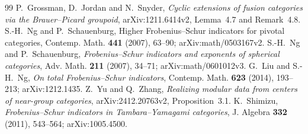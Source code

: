 \documentclass[11pt]{article}
\begin{document}
\begin{thebibliography}{99}
 P.~Grossman, D.~Jordan and N.~Snyder,
\emph{Cyclic extensions of fusion categories via the Brauer--Picard groupoid},
arXiv:1211.6414v2, Lemma~4.7 and Remark~4.8.
 S.-H.~Ng and P.~Schauenburg,
Higher Frobenius--Schur indicators for pivotal categories,
Contemp. Math. \textbf{441} (2007), 63--90; arXiv:math/0503167v2.
 S.-H.~Ng and P.~Schauenburg,
\emph{Frobenius--Schur indicators and exponents of spherical categories},
Adv. Math. \textbf{211} (2007), 34--71; arXiv:math/0601012v3.
 G.~Liu and S.-H.~Ng,
\emph{On total Frobenius--Schur indicators},
Contemp. Math. \textbf{623} (2014), 193--213; arXiv:1212.1435.
 Z.~Yu and Q.~Zhang,
\emph{Realizing modular data from centers of near-group categories},
arXiv:2412.20763v2, Proposition~3.1.
 K.~Shimizu,
\emph{Frobenius--Schur indicators in Tambara--Yamagami categories},
J. Algebra \textbf{332} (2011), 543--564; arXiv:1005.4500.
\end{thebibliography}
\end{document}
